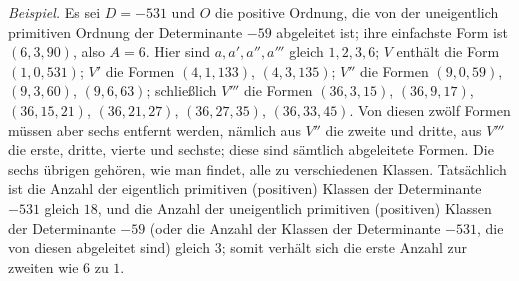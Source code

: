 \textit{Beispiel.} Es sei \(D=-531\) und \(O\) die positive Ordnung, die von der uneigentlich primitiven Ordnung der Determinante \(-59\) abgeleitet ist; ihre einfachste Form ist \((6,3,90)\), also \(A=6\). Hier sind \(a,a',a'',a'''\) gleich \(1,2,3,6\); \(V\) enthält die Form \((1,0,531)\); \(V'\) die Formen \((4,1,133)\), \((4,3,135)\); \(V''\) die Formen \((9,0,59)\), \((9,3,60)\), \((9,6,63)\); schließlich \(V'''\) die Formen \((36,3,15)\), \((36,9,17)\), \((36,15,21)\), \((36,21,27)\), \((36,27,35)\), \((36,33,45)\). Von diesen zwölf Formen müssen aber sechs entfernt werden, nämlich aus \(V''\) die zweite und dritte, aus \(V'''\) die erste, dritte, vierte und sechste; diese sind sämtlich abgeleitete Formen. Die sechs übrigen gehören, wie man findet, alle zu verschiedenen Klassen. Tatsächlich ist die Anzahl der eigentlich primitiven (positiven) Klassen der Determinante \(-531\) gleich \(18\), und die Anzahl der uneigentlich primitiven (positiven) Klassen der Determinante \(-59\) (oder die Anzahl der Klassen der Determinante \(-531\), die von diesen abgeleitet sind) gleich \(3\); somit verhält sich die erste Anzahl zur zweiten wie \(6\) zu \(1\).
